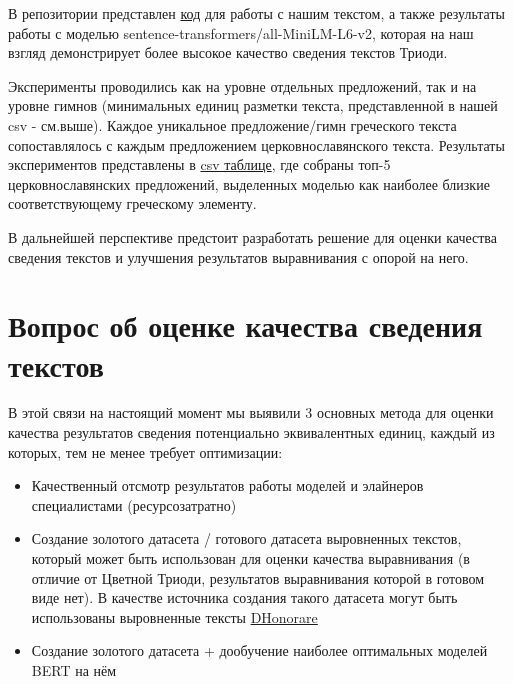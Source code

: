 \documentclass[
  letterpaper,
]{book}
\providecommand{\tightlist}{%
  \setlength{\itemsep}{0pt}\setlength{\parskip}{0pt}}\usepackage{longtable,booktabs,array}
\begin{document}
В репозитории представлен
\href{https://github.com/Drozhzhinastya/GSPC/blob/main/scripts/text-similarity/GSPC_sbert.ipynb}{код}
для работы с нашим текстом, а также результаты работы с моделью
sentence-transformers/all-MiniLM-L6-v2, которая на наш взгляд
демонстрирует более высокое качество сведения текстов Триоди.

Эксперименты проводились как на уровне отдельных предложений, так и на
уровне гимнов (минимальных единиц разметки текста, представленной в
нашей csv - см.выше). Каждое уникальное предложение/гимн греческого
текста сопоставлялось с каждым предложением церковнославянского текста.
Результаты экспериментов представлены в
\href{https://github.com/Drozhzhinastya/GSPC/tree/main/csv/sbert}{csv
таблице}, где собраны топ-5 церковнославянских предложений, выделенных
моделью как наиболее близкие соответствующему греческому элементу.

В дальнейшей перспективе предстоит разработать решение для оценки
качества сведения текстов и улучшения результатов выравнивания с опорой
на него.


\hypertarget{ux432ux43eux43fux440ux43eux441-ux43eux431-ux43eux446ux435ux43dux43aux435-ux43aux430ux447ux435ux441ux442ux432ux430-ux441ux432ux435ux434ux435ux43dux438ux44f-ux442ux435ux43aux441ux442ux43eux432}{%
\chapter{\texorpdfstring{\textbf{Вопрос об оценке качества сведения
текстов}}{Вопрос об оценке качества сведения текстов}}\label{ux432ux43eux43fux440ux43eux441-ux43eux431-ux43eux446ux435ux43dux43aux435-ux43aux430ux447ux435ux441ux442ux432ux430-ux441ux432ux435ux434ux435ux43dux438ux44f-ux442ux435ux43aux441ux442ux43eux432}}

В этой связи на настоящий момент мы выявили 3 основных метода для оценки
качества результатов сведения потенциально эквивалентных единиц, каждый
из которых, тем не менее требует оптимизации:

\begin{itemize}
\tightlist
\item
  Качественный отсмотр результатов работы моделей и элайнеров
  специалистами (ресурсозатратно)
\item
  Создание золотого датасета / готового датасета выровненных текстов,
  который может быть использован для оценки качества выравнивания (в
  отличие от Цветной Триоди, результатов выравнивания которой в готовом
  виде нет). В качестве источника создания такого датасета могут быть
  использованы выровненные тексты
  \href{https://dhonorare.ru/texts/trebnik/molitvy-v-pervyy-den-posle-rozhdeniya-mladentsa}{DHonorare}
\item
  Создание золотого датасета + дообучение наиболее оптимальных моделей
  BERT на нём
\end{itemize}
\end{document}
